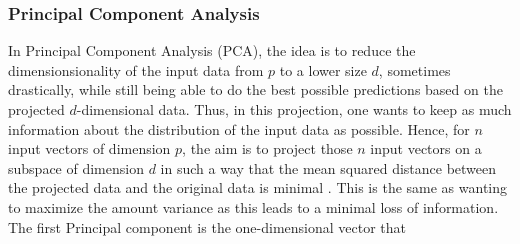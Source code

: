 \documentclass[11pt,a4paper,notitlepage]{article}
\begin{document}
\subsubsection{Principal Component Analysis}
In Principal Component Analysis (PCA), the idea is to reduce the dimensionsionality of the input data from $p$ to a lower size $d$, sometimes drastically, while still being able to do the best possible predictions based on the projected $d$-dimensional data. Thus, in this projection, one wants to keep as much information about the distribution of the input data as possible. Hence, for $n$ input vectors of dimension $p$, the aim is to project those $n$ input vectors on a subspace of dimension $d$ in such a way that the mean squared distance between the projected data and the original data is minimal \citep{handsOnMachineLearning}. This is the same as wanting to maximize the amount variance as this leads to a minimal loss of information. 
The first Principal component is the one-dimensional vector that
\end{document}
